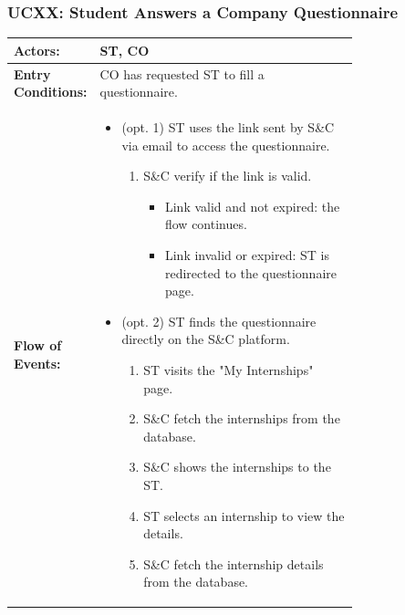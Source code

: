 
\subsubsection{UCXX: Student Answers a Company Questionnaire}
\label{subsubsec:student-answers-a-company-questionnaire}

\begin{center}
    \begin{longtable}{|l|p{0.75\linewidth}|}
        \hline
        \textbf{Actors:}           & ST, CO                                                                             \\
        \hline
        \textbf{Entry Conditions:} & CO has requested ST to fill a questionnaire.                                       \\
        \hline
        \textbf{Flow of Events:}   & \begin{itemize}
                                         \item (opt. 1) ST uses the link sent by S\&C via email to access the questionnaire.
                                               \begin{enumerate}
                      \item S\&C verify if the link is valid.
                            \begin{itemize}
                                \item Link valid and not expired: the flow continues.
                                \item Link invalid or expired: ST is redirected to the questionnaire page.
                            \end{itemize}
                  \end{enumerate}
                                         \item (opt. 2) ST finds the questionnaire directly on the S\&C platform.
                                               \begin{enumerate}
                      \item ST visits the "My Internships" page.
                      \item S\&C fetch the internships from the database.
                      \item S\&C shows the internships to the ST.
                      \item ST selects an internship to view the details.
                      \item S\&C fetch the internship details from the database.

\end{enumerate}
\end{itemize}
\end{longtable}
\end{center}
